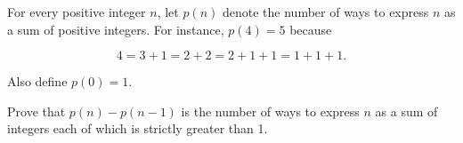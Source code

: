 For every positive integer $n$, let $p(n)$ denote the number of ways to express $n$ as a sum of positive integers. For instance, $p(4)=5$ because

\[4=3+1=2+2=2+1+1=1+1+1.\]

Also define $p(0)=1$.

Prove that $p(n)-p(n-1)$ is the number of ways to express $n$ as a sum of integers each of which is strictly greater than 1.

